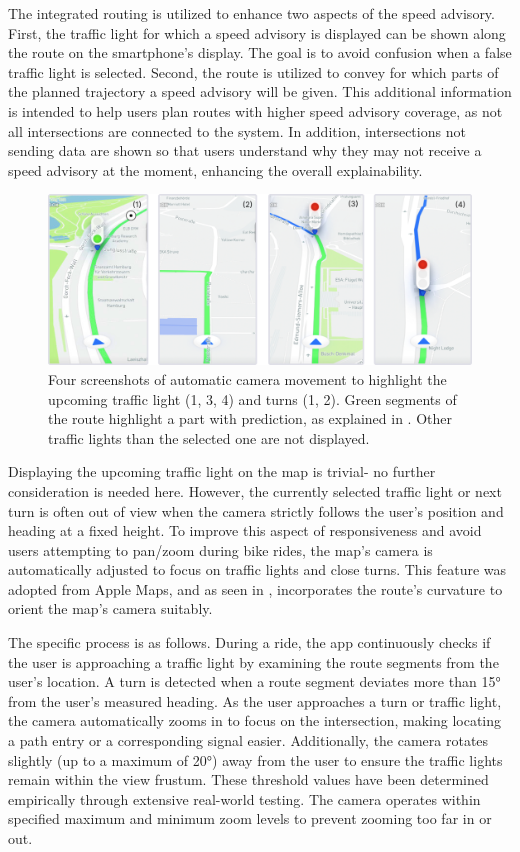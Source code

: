 The integrated routing is utilized to enhance two aspects of the speed advisory. First, the traffic light for which a speed advisory is displayed can be shown along the route on the smartphone's display. The goal is to avoid confusion when a false traffic light is selected. Second, the route is utilized to convey for which parts of the planned trajectory a speed advisory will be given. This additional information is intended to help users plan routes with higher speed advisory coverage, as not all intersections are connected to the system. In addition, intersections not sending data are shown so that users understand why they may not receive a speed advisory at the moment, enhancing the overall explainability.

\begin{figure}[!b]
\centering
\includegraphics[width=\linewidth]{images/camera-controller.png}
\caption{Four screenshots of automatic camera movement to highlight the upcoming traffic light (1, 3, 4) and turns (1, 2). Green segments of the route highlight a part with prediction, as explained in . Other traffic lights than the selected one are not displayed.}
\label{fig:camera-controller}
\end{figure}

Displaying the upcoming traffic light on the map is trivial- no further consideration is needed here. However, the currently selected traffic light or next turn is often out of view when the camera strictly follows the user's position and heading at a fixed height. To improve this aspect of responsiveness and avoid users attempting to pan/zoom during bike rides, the map's camera is automatically adjusted to focus on traffic lights and close turns. This feature was adopted from Apple Maps, and as seen in , incorporates the route's curvature to orient the map's camera suitably.

The specific process is as follows. During a ride, the app continuously checks if the user is approaching a traffic light by examining the route segments from the user's location. A turn is detected when a route segment deviates more than 15° from the user's measured heading. As the user approaches a turn or traffic light, the camera automatically zooms in to focus on the intersection, making locating a path entry or a corresponding signal easier. Additionally, the camera rotates slightly (up to a maximum of 20°) away from the user to ensure the traffic lights remain within the view frustum. These threshold values have been determined empirically through extensive real-world testing. The camera operates within specified maximum and minimum zoom levels to prevent zooming too far in or out.

